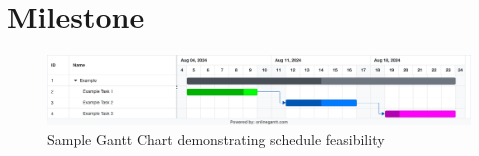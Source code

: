 \section{Milestone}
\begin{figure}[H]
    \centering
    \includegraphics[width=1\linewidth]{Images/gantt.png}
    \caption{Sample Gantt Chart demonstrating schedule feasibility}
    \label{fig:enter-label}
\end{figure}